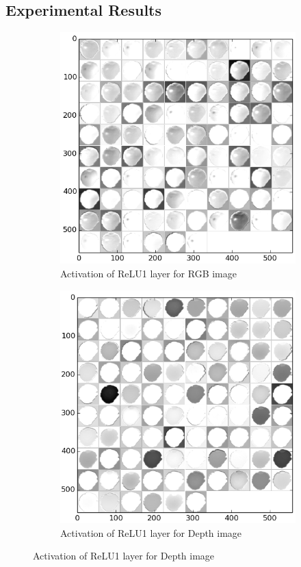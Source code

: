 \subsection{Experimental Results}
\begin{figure}[htbp]
	\centering
	\begin{subfigure}[b]{0.45\linewidth}
		\includegraphics[width=\textwidth]{img/relu1_rgb.png}
		\caption{Activation of ReLU1 layer for RGB image}
	\end{subfigure}   	
	\begin{subfigure}[b]{0.45\linewidth}
		\includegraphics[width=\textwidth]{img/relu1_dep.png}
		\caption{Activation of ReLU1 layer for Depth image}
	\end{subfigure}
	

\end{figure}
